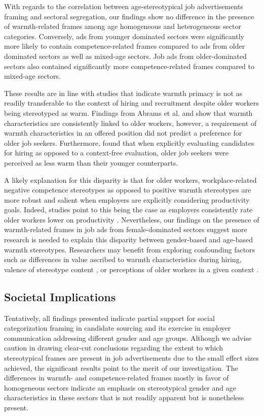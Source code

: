 \documentclass[jou]{apa7}
\begin{document}
With regards to the correlation between age-stereotypical job advertisements framing and sectoral segregation, our findings show no difference in the presence of warmth-related frames among age homogeneous and heterogeneous sector categories. Conversely, ads from younger dominated sectors were significantly more likely to contain competence-related frames compared to ads from older dominated sectors as well as mixed-age sectors. Job ads from older-dominated sectors also contained significantly more competence-related frames compared to mixed-age sectors.

These results are in line with studies that indicate warmth primacy is not as readily transferable to the context of hiring and recruitment despite older workers being stereotyped as warm. Findings from Abrams et al. \textcite{abramsOldUnemployableHow2016} and \textcite{kringsStereotypicalInferencesMediators2011} show that warmth characteristics are consistently linked to older workers, however, a requirement of warmth characteristics in an offered position did not predict a preference for older job seekers. Furthermore,  \textcite{kringsStereotypicalInferencesMediators2011} found that when explicitly evaluating candidates for hiring as opposed to a context-free evaluation, older job seekers were perceived as less warm than their younger counterparts.

A likely explanation for this disparity is that for older workers, workplace-related negative competence stereotypes as opposed to positive warmth stereotypes are more robust and salient when employers are explicitly considering productivity goals. Indeed, studies point to this being the case as employers consistently rate older workers lower on productivity \parencite{kroonReliableUnproductiveStereotypes2018,vandalenProductivityOlderWorkers2010}. Nevertheless, our findings on the presence of warmth-related frames in job ads from female-dominated sectors suggest more research is needed to explain this disparity between gender-based and age-based warmth stereotypes. Researchers may benefit from exploring confounding factors such as differences in value ascribed to warmth characteristics during hiring, valence of stereotype content \parencite{suitnerRoleValencePerception2008}, or perceptions of older workers in a given context \parencite{hennekamEmployabilityOlderWorkers2015}.

\subsection{Societal Implications}
\label{societal_implications}
Tentatively, all findings presented indicate partial support for social categorization framing in candidate sourcing and its exercise in employer communication addressing different gender and age groups. Although we advise caution in drawing clear-cut conclusions regarding the extent to which stereotypical frames are present in job advertisements due to the small effect sizes achieved, the significant results point to the merit of our investigation. The differences in warmth- and competence-related frames mostly in favor of homogeneous sectors indicate an emphasis on stereotypical gender and age characteristics in these sectors that is not readily apparent but is nonetheless present.
\end{document}
